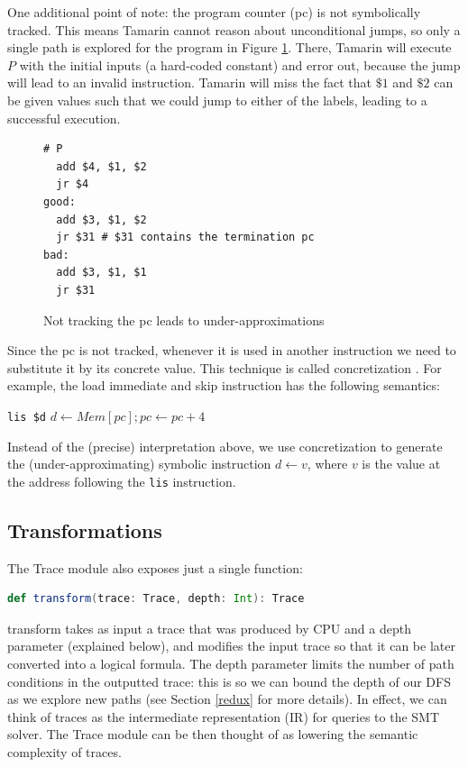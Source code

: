 \documentclass{llncs}
\begin{document}
One additional point of note: the program counter (\textsf{pc}) is not symbolically tracked. This means Tamarin cannot reason about unconditional jumps, so only a single path is explored for the program in Figure \ref{pcnottrack}. There, Tamarin will execute $P$ with the initial inputs (a hard-coded constant) and error out, because the jump will lead to an invalid instruction. Tamarin will miss the fact that $\$1$ and $\$2$ can be given values such that we could jump to either of the labels, leading to a successful  execution. 

\begin{figure}
\begin{lstlisting}
# P
  add $4, $1, $2
  jr $4
good:
  add $3, $1, $2
  jr $31 # $31 contains the termination pc
bad:
  add $3, $1, $1
  jr $31    
\end{lstlisting} 
\caption{Not tracking the \textsf{pc} leads to under-approximations}
\label{pcnottrack}
\end{figure}

Since the \textsf{pc} is not tracked, whenever it is used in another instruction we need to substitute it by its concrete value. This technique is called concretization \cite{david2016specification}. For example, the load immediate and skip instruction has the following semantics:

\lstinline{lis $d} \hspace{2cm} $d \gets Mem[pc]; pc \gets pc + 4$

Instead of the (precise) interpretation above, we use concretization to generate the (under-approximating) symbolic instruction $d \gets v$, where $v$ is the value at the address following the \lstinline{lis} instruction.


\subsection{Transformations}
\label{transsection}

The \textsf{Trace} module also exposes just a single function:

\begin{lstlisting}[language=scala]
def transform(trace: Trace, depth: Int): Trace
\end{lstlisting}

\textsf{transform} takes as input a trace that was produced by \textsf{CPU} and a \textsf{depth} parameter (explained below), and modifies the input trace so that it can be later converted into a logical formula. The \textsf{depth} parameter limits the number of path conditions in the outputted trace: this is so we can bound the depth of our DFS as we explore new paths (see Section \ref{redux} for more details). In effect, we can think of traces as the intermediate representation (IR) for queries to the SMT solver. The \textsf{Trace} module can be then thought of as lowering the semantic complexity of traces.
\end{document}
